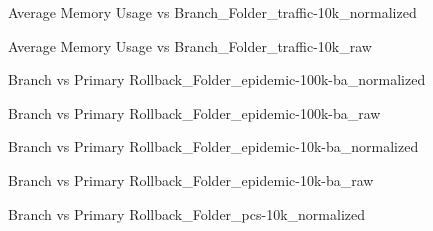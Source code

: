 \vspace{1cm}
\newpage
\begin{figure}[H]
\centering

\caption{Average Memory Usage vs Branch\_Folder\_traffic-10k\_normalized}
\end{figure}
\vspace{1cm}
\begin{figure}[H]
\centering

\caption{Average Memory Usage vs Branch\_Folder\_traffic-10k\_raw}
\end{figure}
\vspace{1cm}
\newpage
\begin{figure}[H]
\centering

\caption{Branch vs Primary Rollback\_Folder\_epidemic-100k-ba\_normalized}
\end{figure}
\vspace{1cm}
\begin{figure}[H]
\centering

\caption{Branch vs Primary Rollback\_Folder\_epidemic-100k-ba\_raw}
\end{figure}
\vspace{1cm}
\newpage
\begin{figure}[H]
\centering

\caption{Branch vs Primary Rollback\_Folder\_epidemic-10k-ba\_normalized}
\end{figure}
\vspace{1cm}
\begin{figure}[H]
\centering

\caption{Branch vs Primary Rollback\_Folder\_epidemic-10k-ba\_raw}
\end{figure}
\vspace{1cm}
\newpage
\begin{figure}[H]
\centering

\caption{Branch vs Primary Rollback\_Folder\_pcs-10k\_normalized}
\end{figure}
